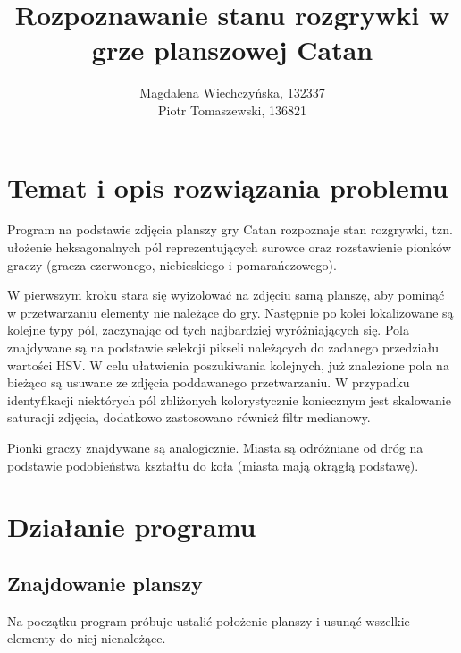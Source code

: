 \documentclass[a4paper]{article}
\title{Rozpoznawanie stanu rozgrywki w grze planszowej Catan}
\author{Magdalena Wiechczyńska, 132337\\
Piotr Tomaszewski, 136821}
\date{} %
\begin{document}
\maketitle

\section{Temat i opis rozwiązania problemu}
	Program na podstawie zdjęcia planszy gry Catan rozpoznaje stan rozgrywki, tzn. ułożenie heksagonalnych pól reprezentujących surowce oraz rozstawienie pionków graczy (gracza czerwonego, niebieskiego i pomarańczowego).
	
	W pierwszym kroku stara się wyizolować na zdjęciu samą planszę, aby pominąć w przetwarzaniu elementy nie należące do gry. Następnie po kolei lokalizowane są kolejne typy pól, zaczynając od
tych najbardziej wyróżniających się. Pola znajdywane są na podstawie selekcji pikseli należących
do zadanego przedziału wartości HSV. W celu ułatwienia poszukiwania kolejnych, już znalezione pola
na bieżąco są usuwane ze zdjęcia poddawanego przetwarzaniu. W przypadku identyfikacji niektórych pól zbliżonych kolorystycznie koniecznym jest skalowanie saturacji zdjęcia, dodatkowo zastosowano również filtr medianowy.

	Pionki graczy znajdywane są analogicznie. Miasta są odróżniane od dróg na podstawie podobieństwa
kształtu do koła (miasta mają okrągłą podstawę).

	
\section{Działanie programu}
    \subsection{Znajdowanie planszy}
     Na początku program próbuje ustalić położenie planszy i usunąć wszelkie elementy do niej nienależące.
\end{document}
